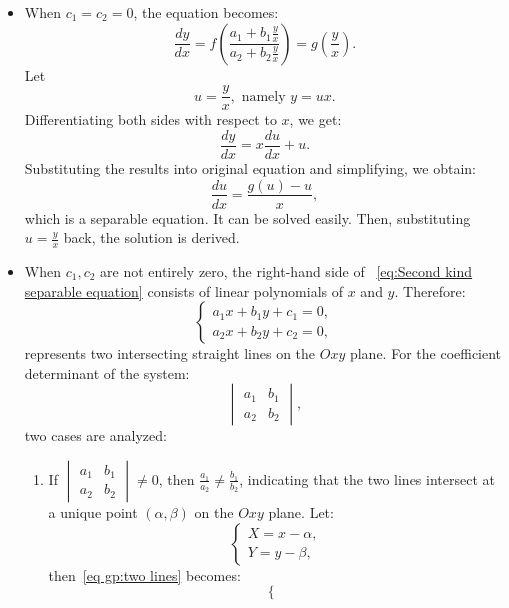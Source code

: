 \documentclass[11pt]{../../TexTemplate/elegantbook}
\begin{document}
\begin{itemize}
    \item  When \(c_1 = c_2 = 0\), the equation becomes:  
        \[
        \frac{dy}{dx} = f\left(\frac{a_1 + b_1 \frac{y}{x}}{a_2 + b_2 \frac{y}{x}}\right) = g\left(\frac{y}{x}\right).
        \]
        Let
        \[
        u = \frac{y}{x}, \text{ namely } y = ux. 
        \]
        Differentiating both sides with respect to \(x\), we get:
        \[
        \frac{dy}{dx} = x \frac{du}{dx} + u.
        \]
        Substituting the results into original equation and simplifying, we obtain:
        \[
        \frac{du}{dx} = \frac{g(u) - u}{x},
        \]
        which is a separable equation. 
        It can be solved easily. 
        Then, substituting \(u = \frac{y}{x}\) back, the solution is derived.
    \item When \(c_1, c_2\) are not entirely zero, the right-hand side of ~\eqref{eq:Second kind separable equation} 
        consists of linear polynomials of \(x\) and \(y\). Therefore:
        \[
        \begin{cases}\label{eq gp:two lines}
        a_1x + b_1y + c_1 = 0, \\
        a_2x + b_2y + c_2 = 0,
        \end{cases}
        \]
        represents two intersecting straight lines on the \(Oxy\) plane. For the coefficient determinant of the system:
        \[
        \begin{vmatrix}
        a_1 & b_1 \\
        a_2 & b_2
        \end{vmatrix},
        \]
        two cases are analyzed:
        \begin{enumerate}
            \item  If \(\begin{vmatrix} a_1 & b_1 \\ a_2 & b_2 \end{vmatrix} \neq 0\), 
                then \(\frac{a_1}{a_2} \neq \frac{b_1}{b_2}\), 
                indicating that the two lines intersect at a unique point \((\alpha, \beta)\) on the \(Oxy\) plane. 
                Let:
                \[
                \begin{cases}
                X = x - \alpha, \\
                Y = y - \beta,
                \end{cases}
                \]
                then~\eqref{eq gp:two lines} becomes:
                \[
                \begin{cases}

\end{cases}\]
\end{enumerate}
\end{itemize}
\end{document}
